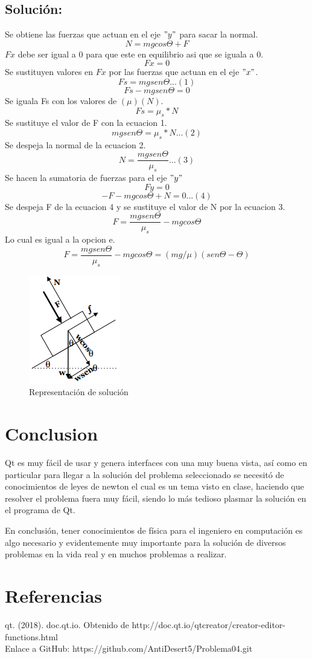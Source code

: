\documentclass[11pt,letter]{article}
\begin{document}
\subsection*{Soluci\'on:}
\begin{center}
Se obtiene las fuerzas que actuan en el eje $"y"$ para sacar la normal.
$$N = mg cos \Theta + F$$
$Fx$ debe ser igual a 0 para que este en equilibrio asi que se iguala a 0.
$$Fx = 0$$
Se sustituyen valores en $Fx $ por las fuerzas que actuan en el eje $"x"$.
$$Fs = mg sen \Theta ...(1)$$
$$Fs - mg sen\Theta = 0$$
Se iguala Fs con los valores de $(\mu)(N)$.
$$Fs = \mu_s * N$$
Se sustituye el valor de F con la ecuacion 1.
$$mg sen\Theta = \mu_s * N...(2)$$
Se despeja la normal de la ecuacion 2.
$$N = \frac{mg sen\Theta}{\mu_s}...(3)$$
Se hacen la sumatoria de fuerzas para el eje $"y"$
$$Fy = 0$$
$$-F - mg cos\Theta + N=0...(4)$$
Se despeja F de la ecuacion 4 y se sustituye el valor de N por la ecuacion 3.
$$F = \frac{mg sen\Theta}{\mu_s} - mg cos\Theta$$
Lo cual es igual a la opcion e.
$$F = \frac{mg sen\Theta}{\mu_s} - mg cos\Theta=(mg/\mu)(sen\Theta -\Theta)$$
\begin{figure}[h]
  \centering
      \includegraphics[scale=0.9]{imagen2}
            \caption{Representaci\'on de soluci\'on}
\end{figure}
\end{center}
\newpage
\section*{Conclusion}
Qt es muy f\'acil de usar y genera interfaces con una muy buena vista, as\'i como en particular para llegar a la soluci\'on del problema seleccionado se necesit\'o de conocimientos de leyes de newton el cual es un tema visto en clase, haciendo que resolver el problema fuera muy f\'acil, siendo lo m\'as tedioso plasmar la soluci\'on en el programa de Qt.

En conclusi\'on, tener conocimientos de f\'isica para el ingeniero en computaci\'on es algo necesario y evidentemente muy importante para la soluci\'on de diversos problemas en la vida real y en muchos problemas a realizar.

\newpage
\section*{Referencias}
qt. (2018). doc.qt.io. Obtenido de http://doc.qt.io/qtcreator/creator-editor-functions.html
\\

Enlace a GitHub: https://github.com/AntiDesert5/Problema04.git
\end{document}
